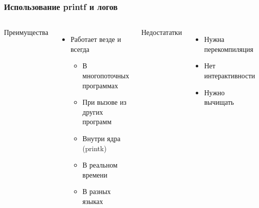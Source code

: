 \begin{frame}
 \frametitle{Использование printf и логов}
 \begin{columns}
    \begin{center}
     Преимущества 
    \end{center}
    \begin{itemize}
     \item Работает везде и всегда
     \begin{itemize}
       \item В многопоточных программах
       \item При вызове из других программ
       \item Внутри ядра (printk)
       \item В реальном времени
       \item В разных языках
      \end{itemize}
    \end{itemize}
    \begin{center}
     Недостататки
    \end{center}
    \begin{itemize}
     \item Нужна перекомпиляция
     \item Нет интерактивности
     \item Нужно вычищать
    \end{itemize}
 \end{columns}
\end{frame}

